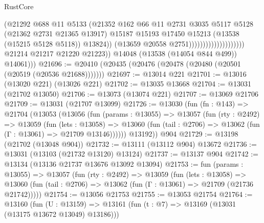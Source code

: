 \begin{lexlean}{RustCore}
\begin{coremodule}
                                                    (@21292
                                                      @688
                                                      @11
                                                      @5133
                                                      (@21352
                                                        @162
                                                        @66
                                                        @11
                                                        @2731
                                                        @3035
                                                        @5117
                                                        @5128
                                                        (@21362 @2731 @21365 @13917)
                                                        @15187
                                                        @15193
                                                        @17450
                                                        @15213
                                                        (@13538 (@15215 @5128 @5118))
                                                        @13824))
                                                    (@13659 @20558 @2751))))))))))))))))))))
              @21214
              @21217
              @21220
              @21223))
          @14048
          (@13538 (@14054 @844 @499))
          @14061)))
@21696 := @20410 (@20435 (@20476 (@20478 (@20480 (@20501 (@20519 (@20536 @21688)))))))
@21697 := @13014 @221
@21701 := @13016 (@13020 @221) (@13026 @221)
@21702 := @13035 @13668
@21704 := @13031 (@21702 @13050)
@21706 := @13073 (@13074 @221)
@21707 := @13069 @21706
@21709 := @13031 (@21707 @13099)
@21726 := @13030
    (fun (fn : @143) =>
    @21704
      (@13053
        (@13056
          (fun (params : @13055) =>
          @13057
            (fun (rty : @2492) =>
            @13059
              (fun (lets : @13058) =>
              @13060 (fun (tail : @2706) => @13062 (fun (Γ : @13061) => @21709 @13146))))))
        @13192))
    @904
@21729 := @13198 (@21702 (@13048 @904))
@21732 := @13111 (@13112 @904) @13672
@21736 := @13031 (@13103 (@21732 @13120) @13124)
@21737 := @13137 @904
@21742 := @13134 (@13136 @21737 @13676 @13092 @13094)
@21753 := fun (params : @13055) =>
  @13057
    (fun (rty : @2492) =>
    @13059
      (fun (lets : @13058) =>
      @13060 (fun (tail : @2706) => @13062 (fun (Γ : @13061) => @21709 (@21736 @21742)))))
@21754 := @13056 @21753
@21755 := @13053 @21754
@21764 := @13160
    (fun (U : @13159) => @13161 (fun (t : @7) => @13169 (@13031 (@13175 @13672 @13049) @13186)))

\end{coremodule}
\end{lexlean}
